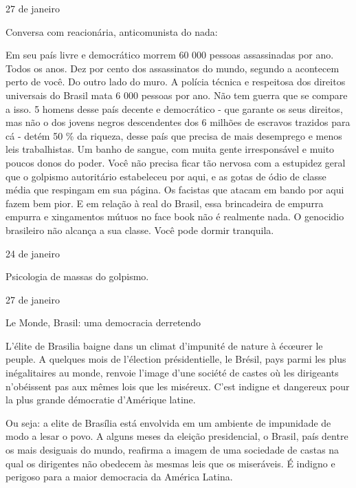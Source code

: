 \begin{flushright}
27 de janeiro
\end{flushright}

Conversa com reacionária, anticomunista do nada:

Em seu país livre e democrático morrem 60 000 pessoas assassinadas por
ano. Todos os anos. Dez por cento dos assassinatos do mundo, segundo a
 acontecem perto de você. Do outro lado do muro. A polícia técnica e
respeitosa dos direitos universais do Brasil mata 6 000 pessoas por ano.
Não tem guerra que se compare a isso. 5 homens desse país decente e
democrático - que garante os seus direitos, mas não o dos jovens negros
descendentes dos 6 milhões de escravos trazidos para cá - detém 50 \% da
riqueza, desse país que precisa de mais desemprego e menos leis
trabalhistas. Um banho de sangue, com muita gente irresponsável e muito
poucos donos do poder. Você não precisa ficar tão nervosa com a
estupidez geral que o golpismo autoritário estabeleceu por aqui, e as
gotas de ódio de classe média que respingam em sua página. Os facistas
que atacam em bando por aqui fazem bem pior. E em relação à real do
Brasil, essa brincadeira de empurra empurra e xingamentos mútuos no face
book não é realmente nada. O genocidio brasileiro não alcança a sua
classe. Você pode dormir tranquila.

\begin{flushright}
24 de janeiro
\end{flushright}

Psicologia de massas do golpismo.

\begin{flushright}
27 de janeiro
\end{flushright}

Le Monde, Brasil: uma democracia derretendo

L'élite de Brasilia baigne dans un climat d'impunité de nature à écœurer
le peuple. A quelques mois de l'élection présidentielle, le Brésil, pays
parmi les plus inégalitaires au monde, renvoie l'image d'une société de
castes où les dirigeants n'obéissent pas aux mêmes lois que les
miséreux. C'est indigne et dangereux pour la plus grande démocratie
d'Amérique latine.

Ou seja: a elite de Brasília está envolvida em um ambiente de impunidade
de modo a lesar o povo. A alguns meses da eleição presidencial, o
Brasil, país dentre os mais desiguais do mundo, reafirma a imagem de uma
sociedade de castas na qual os dirigentes não obedecem às mesmas leis
que os miseráveis. É indigno e perigoso para a maior democracia da
América Latina.

